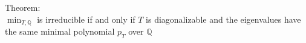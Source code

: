 \documentclass[preview]{standalone}
\begin{document}
\begin{center}
Theorem: \\ $\min_{T, \mathbb{Q}}$ is irreducible if and only if $T$ is diagonalizable and the eigenvalues have the same minimal polynomial $p_T$ over $\mathbb{Q}$
\end{center}
\end{document}
